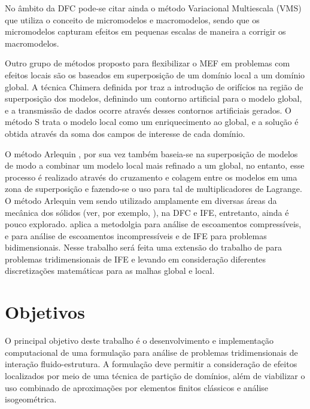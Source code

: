 \documentclass[tese_patricia.tex]{subfiles}
\begin{document}
No âmbito da DFC pode-se citar ainda o método Variacional Multiescala (VMS) \cite{Hughesetal:1998} que utiliza o conceito de micromodelos e macromodelos, sendo que os micromodelos capturam efeitos em pequenas escalas de maneira a corrigir os macromodelos.

Outro grupo de métodos proposto para flexibilizar o MEF em problemas com efeitos locais são os baseados em superposição de um domínio local a um domínio global. A técnica Chimera definida por  traz a introdução de orifícios na região de superposição dos modelos, definindo um contorno artificial para o modelo global, e a transmissão de dados ocorre através desses contornos artificiais gerados. O método S \cite{Fish:1992} trata o modelo local como um enriquecimento ao global, e a solução é obtida através da soma dos campos de interesse de cada domínio.

O método Arlequin \cite{Dhia:1998,DhiaR:2001}, por sua vez também baseia-se na superposição de modelos de modo a combinar um modelo local mais refinado a um global, no entanto, esse processo é realizado através do cruzamento e colagem entre os modelos em uma zona de superposição e fazendo-se o uso para tal de multiplicadores de Lagrange.  O método Arlequin vem sendo utilizado amplamente em diversas áreas da mecânica dos sólidos (ver, por exemplo, ), na DFC e IFE, entretanto, ainda é pouco explorado.  aplica a metodolgia para análise de escoamentos compressíveis, e  para análise de escoamentos incompressíveis e de IFE para problemas bidimensionais. Nesse trabalho será feita uma extensão do trabalho de   para problemas tridimensionais de IFE e levando em consideração diferentes discretizações matemáticas para as malhas global e local.

\section[Objetivos]{Objetivos}

O principal objetivo deste trabalho é o desenvolvimento e implementação computacional de uma formulação para análise de problemas tridimensionais de interação fluido-estrutura. A formulação deve permitir a consideração de efeitos localizados por meio de uma técnica de partição de domínios, além de viabilizar o uso combinado de aproximações por elementos finitos clássicos e análise isogeométrica.
\end{document}
